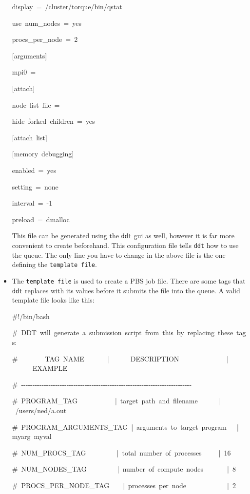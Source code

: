 \begin{itemize}
\begin{lyxcode}
display~=~/cluster/torque/bin/qstat~

use~num\_nodes~=~yes~

procs\_per\_node~=~2

{[}arguments]~

mpi0~=

{[}attach]~

node~list~file~=~

hide~forked~children~=~yes

{[}attach~list]

{[}memory~debugging]~

enabled~=~yes~

setting~=~none~

interval~=~-1~

preload~=~dmalloc~
\end{lyxcode}
This file can be generated using the \texttt{ddt} gui as well, however
it is far more convenient to create beforehand. This configuration
file tells \texttt{ddt} how to use the queue. The only line you have
to change in the above file is the one defining the \texttt{template
file}.

\item The \texttt{template file} is used to create a PBS job file. There
are some tags that \texttt{ddt} replaces with its values before it
submits the file into the queue. A valid template file looks like
this:

\begin{lyxcode}
\#!/bin/bash

\#~DDT~will~generate~a~submission~script~from~this~by~replacing~these~tags:~

\#~~~~~~~~TAG~NAME~~~~~~~|~~~~~~DESCRIPTION~~~~~~~~~~~~~~|~~~~~~EXAMPLE~

\#~-{}-{}-{}-{}-{}-{}-{}-{}-{}-{}-{}-{}-{}-{}-{}-{}-{}-{}-{}-{}-{}-{}-{}-{}-{}-{}-{}-{}-{}-{}-{}-{}-{}-{}-{}-{}-{}-{}-{}-{}-{}-{}-{}-{}-{}-{}-{}-{}-{}-{}-{}-{}-{}-{}-{}-{}-{}-{}-{}-{}-{}-{}-{}-{}-{}-{}-{}-{}-{}-{}-{}-{}-{}-{}-~

\#~PROGRAM\_TAG~~~~~~~~~~~|~target~path~and~filename~~~~~~|~/users/ned/a.out~

\#~PROGRAM\_ARGUMENTS\_TAG~|~arguments~to~target~program~~~|~-myarg~myval~

\#~NUM\_PROCS\_TAG~~~~~~~~~|~total~number~of~processes~~~~~|~16~

\#~NUM\_NODES\_TAG~~~~~~~~~|~number~of~compute~nodes~~~~~~~|~8~

\#~PROCS\_PER\_NODE\_TAG~~~~|~processes~per~node~~~~~~~~~~~~|~2~


\end{lyxcode}
\end{itemize}
